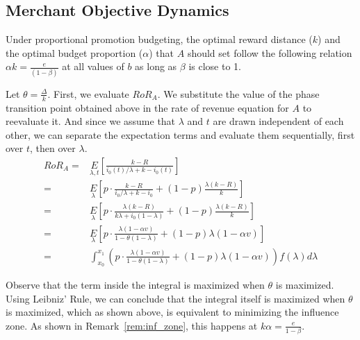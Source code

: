 

\subsection{Merchant Objective Dynamics}

\begin{theorem}
Under proportional promotion budgeting, the optimal reward distance ($k$) and the optimal budget proportion ($\alpha$) that $A$ should set follow the following relation $\alpha k = \frac{e}{(1-\beta)}$ at all values of $b$ as long as $\beta$ is close to 1.
\end{theorem}
\proof
Let $\theta = \frac{\Delta}{k}$. First, we evaluate $RoR_A$.
We substitute the value of the phase transition point obtained above in the rate of revenue equation for $A$ to reevaluate it. 
And since we assume that $\lambda$ and $t$ are drawn independent of each other, we can separate the expectation terms and evaluate them sequentially, first over $t$, then over $\lambda$.
\begin{align*}
RoR_A =& \underset{\lambda, t}E\left[\frac{k-R}{i_0(t)/\lambda + k - i_0(t)}\right]\\
                                       =& \underset{\lambda}E\left[p\cdot\frac{k-R}{i_0/\lambda + k - i_0} + (1-p)\frac{\lambda(k-R)}{k}\right]\\
                                       =& \underset{\lambda}E\left[p\cdot\frac{\lambda(k-R)}{k\lambda + i_0(1-\lambda)} + (1-p)\frac{\lambda(k-R)}{k}\right]\\
                                       =& \underset{\lambda}E\left[p\cdot\frac{\lambda(1-\alpha v)}{1-\theta(1-\lambda)} + (1-p)\lambda (1-\alpha v)\right]\\
                                       =& \int_{x_0}^{x_1} \left(p\cdot\frac{\lambda(1-\alpha v)}{1-\theta(1-\lambda)} + (1-p)\lambda (1-\alpha v)\right) f(\lambda) d\lambda
\end{align*}

Observe that the term inside the integral is maximized when $\theta$ is maximized.
Using Leibniz' Rule, we can conclude that the integral itself is maximized when $\theta$ is maximized, which as shown above, is equivalent to minimizing the influence zone.
As shown in Remark~\ref{rem:inf_zone}, this happens at $k \alpha = \frac{e}{1-\beta}$. 
\endproof

